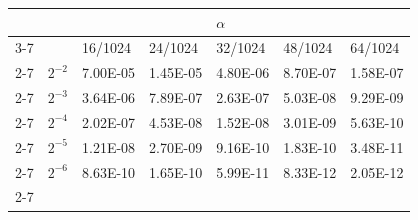 \renewcommand{\arraystretch}{1.5}
\begin{table}[]
\centering
\begin{tabular}{lllllll}
                                &                               &                                                       &                                                       & $\alpha$                                              &                                                       &                                                       \\ \cline{3-7} 
                                & \multicolumn{1}{l|}{}         & \multicolumn{1}{l|}{16/1024}                          & \multicolumn{1}{l|}{24/1024}                          & \multicolumn{1}{l|}{32/1024}                          & \multicolumn{1}{l|}{48/1024}                          & \multicolumn{1}{l|}{64/1024}                          \\ \cline{2-7} 
\multicolumn{1}{l|}{}           & \multicolumn{1}{l|}{$2^{-2}$} & \multicolumn{1}{l|}{\cellcolor[HTML]{C0C0C0}7.00E-05} & \multicolumn{1}{l|}{\cellcolor[HTML]{C0C0C0}1.45E-05} & \multicolumn{1}{l|}{\cellcolor[HTML]{C0C0C0}4.80E-06} & \multicolumn{1}{l|}{\cellcolor[HTML]{C0C0C0}8.70E-07} & \multicolumn{1}{l|}{\cellcolor[HTML]{C0C0C0}1.58E-07} \\ \cline{2-7} 
\multicolumn{1}{l|}{}           & \multicolumn{1}{l|}{$2^{-3}$} & \multicolumn{1}{l|}{3.64E-06}                         & \multicolumn{1}{l|}{7.89E-07}                         & \multicolumn{1}{l|}{2.63E-07}                         & \multicolumn{1}{l|}{5.03E-08}                         & \multicolumn{1}{l|}{9.29E-09}                         \\ \cline{2-7} 
\multicolumn{1}{l|}{}           & \multicolumn{1}{l|}{$2^{-4}$} & \multicolumn{1}{l|}{\cellcolor[HTML]{C0C0C0}2.02E-07} & \multicolumn{1}{l|}{\cellcolor[HTML]{C0C0C0}4.53E-08} & \multicolumn{1}{l|}{\cellcolor[HTML]{C0C0C0}1.52E-08} & \multicolumn{1}{l|}{\cellcolor[HTML]{C0C0C0}3.01E-09} & \multicolumn{1}{l|}{\cellcolor[HTML]{C0C0C0}5.63E-10} \\ \cline{2-7} 
\multicolumn{1}{l|}{$\Delta t$} & \multicolumn{1}{l|}{$2^{-5}$} & \multicolumn{1}{l|}{1.21E-08}                         & \multicolumn{1}{l|}{2.70E-09}                         & \multicolumn{1}{l|}{9.16E-10}                         & \multicolumn{1}{l|}{1.83E-10}                         & \multicolumn{1}{l|}{3.48E-11}                         \\ \cline{2-7} 
\multicolumn{1}{l|}{}           & \multicolumn{1}{l|}{$2^{-6}$} & \multicolumn{1}{l|}{\cellcolor[HTML]{C0C0C0}8.63E-10} & \multicolumn{1}{l|}{\cellcolor[HTML]{C0C0C0}1.65E-10} & \multicolumn{1}{l|}{\cellcolor[HTML]{C0C0C0}5.99E-11} & \multicolumn{1}{l|}{\cellcolor[HTML]{C0C0C0}8.33E-12} & \multicolumn{1}{l|}{\cellcolor[HTML]{C0C0C0}2.05E-12} \\ \cline{2-7} 

\end{tabular}
\end{table}
